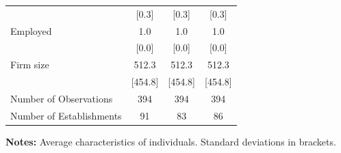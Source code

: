 \documentclass{article}
\begin{document}
\begin{table}[htbp]
\begin{threeparttable}
\begin{tabular}{llll}
\multicolumn{1}{l}{} &
  \multicolumn{1}{c}{[0.3]} &
  \multicolumn{1}{c}{[0.3]} &
  \multicolumn{1}{c}{[0.3]} \\
\multicolumn{1}{l}{Employed} &
  \multicolumn{1}{c}{1.0} &
  \multicolumn{1}{c}{1.0} &
  \multicolumn{1}{c}{1.0} \\
\multicolumn{1}{l}{} &
  \multicolumn{1}{c}{[0.0]} &
  \multicolumn{1}{c}{[0.0]} &
  \multicolumn{1}{c}{[0.0]} \\
\multicolumn{1}{l}{Firm size} &
  \multicolumn{1}{c}{512.3} &
  \multicolumn{1}{c}{512.3} &
  \multicolumn{1}{c}{512.3} \\
\multicolumn{1}{l}{} &
  \multicolumn{1}{c}{[454.8]} &
  \multicolumn{1}{c}{[454.8]} &
  \multicolumn{1}{c}{[454.8]} \\
\midrule
\multicolumn{1}{l}{Number of Observations} &
  \multicolumn{1}{c}{394} &
  \multicolumn{1}{c}{394} &
  \multicolumn{1}{c}{394} \\
\multicolumn{1}{l}{Number of Establishments} &
  \multicolumn{1}{c}{91} &
  \multicolumn{1}{c}{83} &
  \multicolumn{1}{c}{86} \\
\bottomrule
\end{tabular}

 \footnotesize  
\textbf{Notes:} Average characteristics of individuals. Standard deviations in brackets. 
\end{threeparttable} 
\end{table}
\end{document}
